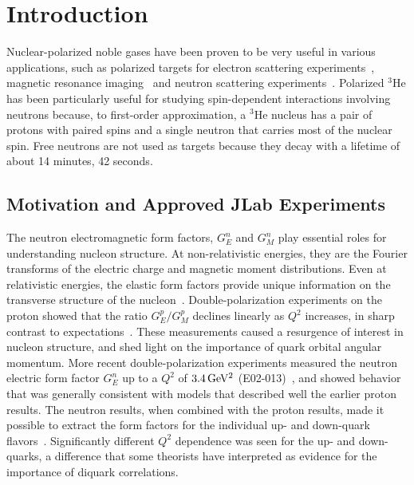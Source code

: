 \chapter{Introduction}
\label{chap:chap1}

Nuclear-polarized noble gases have been proven to be very useful in various applications, such as polarized targets for electron scattering experiments~\cite{PhysRevLett.71.959}, magnetic resonance imaging~\cite{MRI} and neutron scattering experiments~\cite{Neutron}. Polarized $^3$He has been particularly useful for studying spin-dependent interactions involving neutrons because, to first-order approximation, a $^{3}$He nucleus has a pair of protons with paired spins and a single neutron that carries most of the nuclear spin. Free neutrons are not used as targets because they decay with a lifetime of about 14 minutes, 42 seconds. 

\section{Motivation and Approved JLab Experiments}

The neutron electromagnetic form factors, $G_E^n$ and $G_M^n$ play essential roles for understanding nucleon structure. At non-relativistic energies, they are the Fourier transforms of the electric charge and magnetic moment distributions. Even at relativistic energies, the elastic form factors provide unique information on the transverse structure of the nucleon~\cite{PhysRevLett.99.112001, PhysRevLett.100.032004}. Double-polarization experiments on the proton showed that the ratio $G_E^p/G_M^p$ declines linearly as $Q^2$ increases, in sharp contrast to expectations~\cite{PhysRevLett.84.1398}. These measurements caused a resurgence of interest in nucleon structure, and shed light on the importance of quark orbital angular momentum. More recent double-polarization experiments measured the neutron electric form factor $G_E^n$ up to a $Q^2$ of $\rm 3.4\,GeV^2$ (E02-013)~\cite{Phys.Rev.Lett.105.262302}, and showed behavior that was generally consistent with models that described well the earlier proton results. The neutron results, when combined with the proton results, made it possible to extract the form factors for the individual up- and down-quark flavors~\cite{PhysRevLett.106.252003}. Significantly different $Q^2$ dependence was seen for the up- and down-quarks, a difference that some theorists have interpreted as evidence for the importance of diquark correlations.  

